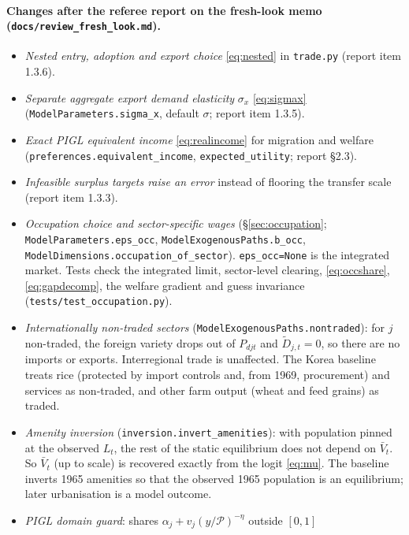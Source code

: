 \documentclass[11pt]{article}
\begin{document}
\paragraph{Changes after the referee report on the fresh-look memo
(\texttt{docs/review\_fresh\_look.md}).}
\begin{itemize}[leftmargin=1.5em]
\item \emph{Nested entry, adoption and export choice} \eqref{eq:nested} in \texttt{trade.py}
      (report item 1.3.6).
\item \emph{Separate aggregate export demand elasticity} $\sigma_x$ \eqref{eq:sigmax}
      (\texttt{ModelParameters.sigma\_x}, default $\sigma$; report item 1.3.5).
\item \emph{Exact PIGL equivalent income} \eqref{eq:realincome} for migration and welfare
      (\texttt{preferences.equivalent\_income}, \texttt{expected\_utility}; report \S2.3).
\item \emph{Infeasible surplus targets raise an error} instead of flooring the transfer scale
      (report item 1.3.3).
\item \emph{Occupation choice and sector-specific wages} (\S\ref{sec:occupation};
      \texttt{ModelParameters.eps\_occ}, \texttt{ModelExogenousPaths.b\_occ},
      \texttt{ModelDimensions.occupation\_of\_sector}). \texttt{eps\_occ=None} is the
      integrated market. Tests check the integrated limit, sector-level clearing,
      \eqref{eq:occshare}, \eqref{eq:gapdecomp}, the welfare gradient and guess invariance
      (\texttt{tests/test\_occupation.py}).
\item \emph{Internationally non-traded sectors} (\texttt{ModelExogenousPaths.nontraded}):
      for $j$ non-traded, the foreign variety drops out of $P_{djt}$ and $\tilde D_{j,t}=0$, so
      there are no imports or exports. Interregional trade is unaffected. The Korea baseline
      treats rice (protected by import controls and, from 1969, procurement) and services as
      non-traded, and other farm output (wheat and feed grains) as traded.
\item \emph{Amenity inversion} (\texttt{inversion.invert\_amenities}): with population
      pinned at the observed $L_t$, the rest of the static equilibrium does not depend on
      $\bar V_t$. So $\bar V_t$ (up to scale) is recovered exactly from the logit
      \eqref{eq:mu}. The baseline inverts 1965 amenities so that the observed 1965 population
      is an equilibrium; later urbanisation is a model outcome.
\item \emph{PIGL domain guard}: shares $\alpha_j+v_j(y/\mathcal P)^{-\eta}$ outside $[0,1]$

\end{itemize}
\end{document}
